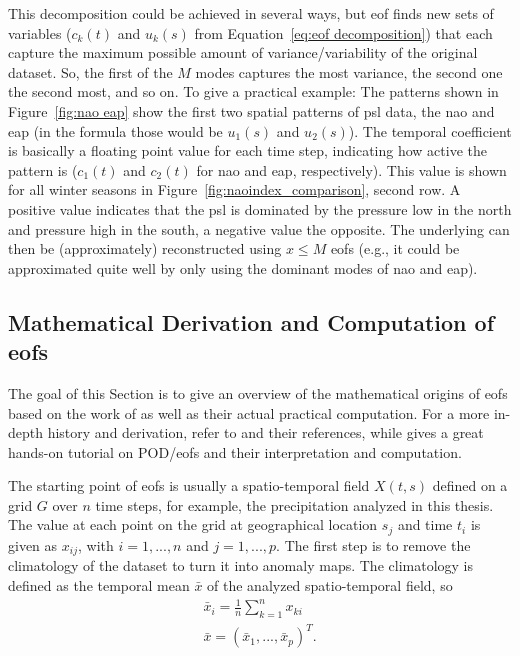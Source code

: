 This decomposition could be achieved in several ways, but \ac{eof} finds new sets of variables ($c_k(t)$ and $u_k(s)$ from Equation~\ref{eq:eof decomposition}) that each capture the maximum possible amount of variance/variability of the original dataset. 
So, the first of the $M$ modes captures the most variance, the second one the second most, and so on. 
To give a practical example: The patterns shown in Figure~\ref{fig:nao eap} show the first two spatial patterns of \ac{psl} data, the \ac{nao} and \ac{eap} (in the formula those would be $u_1(s)$ and $u_2(s)$). 
The temporal coefficient is basically a floating point value for each time step, indicating how active the pattern is ($c_1(t)$ and $c_2(t)$ for \ac{nao} and \ac{eap}, respectively). 
This value is shown for all winter seasons in Figure~\ref{fig:naoindex_comparison}, second row. 
A positive value indicates that the \ac{psl} is dominated by the pressure low in the north and pressure high in the south, a negative value the opposite. 
The underlying can then be (approximately) reconstructed using $x \leq M$ \acp{eof} (e.g., it could be approximated quite well by only using the dominant modes of \ac{nao} and \ac{eap}). 

\subsection{Mathematical Derivation and Computation of \acp{eof}}
\label{sec:eof derivation}

The goal of this Section is to give an overview of the mathematical origins of \acp{eof} based on the work of  as well as their actual practical computation. 
For a more in-depth history and derivation, refer to \cite{hannachi_empirical_2007} and their references, while  gives a great hands-on tutorial on POD/\acp{eof} and their interpretation and computation. 

The starting point of \acp{eof} is usually a spatio-temporal field $X(t, s)$ defined on a grid $G$ over $n$ time steps, for example, the precipitation analyzed in this thesis. 
The value at each point on the grid at geographical location $s_j$ and time $t_i$ is given as $x_{ij}$, with $i = 1, ..., n$  and $j = 1, ..., p$.  
The first step is to remove the climatology of the dataset to turn it into anomaly maps. 
The climatology is defined as the temporal mean $\bar{x}$ of the analyzed spatio-temporal field, so 
\begin{align}
  \bar{x}_i = \frac{1}{n} \sum^{n}_{k=1} x_{ki} \\
  \bar{x} = (\bar{x}_1, ..., \bar{x}_p)^T .
  \label{eq:climatology}
\end{align}

